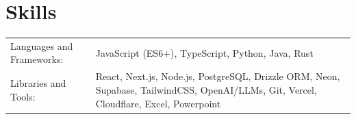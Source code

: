 \documentclass[a4paper, 10pt]{article}
\begin{document}
\section{Skills}
\begin{tabularx}{\linewidth}{@{}l X@{}}
Languages and Frameworks: &  \normalsize{JavaScript (ES6+), TypeScript, Python, Java, Rust}\\
Libraries and Tools: &  \normalsize{React, Next.js, Node.js, PostgreSQL, Drizzle ORM, Neon, Supabase, TailwindCSS, OpenAI/LLMs, Git, Vercel, Cloudflare, Excel, Powerpoint}\\
\end{tabularx}
\end{document}
